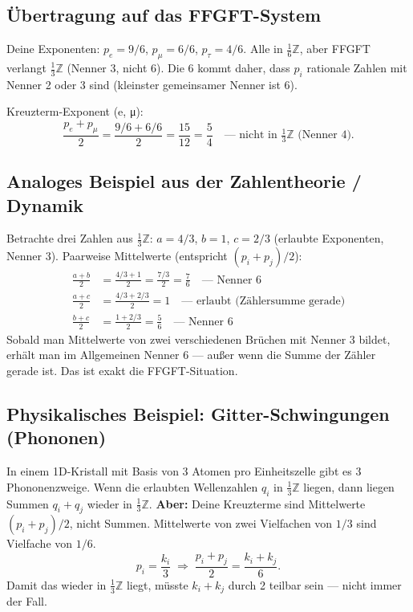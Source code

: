 \subsection{Übertragung auf das FFGFT-System}

Deine Exponenten:
$p_e=9/6$, $p_\mu=6/6$, $p_\tau=4/6$. Alle in $\tfrac{1}{6}\mathbb{Z}$,
aber FFGFT verlangt $\tfrac{1}{3}\mathbb{Z}$ (Nenner 3, nicht 6).
Die 6 kommt daher, dass $p_i$ rationale Zahlen mit Nenner 2 oder 3 sind
(kleinster gemeinsamer Nenner ist 6).

Kreuzterm-Exponent (e, μ):
\[
  \frac{p_e+p_\mu}{2} = \frac{9/6+6/6}{2}
  = \frac{15}{12} = \frac{5}{4}
  \quad\text{— nicht in }\tfrac{1}{3}\mathbb{Z}\text{ (Nenner 4).}
\]

\subsection{Analoges Beispiel aus der Zahlentheorie / Dynamik}

Betrachte drei Zahlen aus $\tfrac{1}{3}\mathbb{Z}$:
$a=4/3$, $b=1$, $c=2/3$ (erlaubte Exponenten, Nenner 3).
Paarweise Mittelwerte (entspricht $(p_i+p_j)/2$):
\begin{align*}
  \frac{a+b}{2} &= \frac{4/3+1}{2} = \frac{7/3}{2} = \frac{7}{6}
    \quad\text{— Nenner 6} \\
  \frac{a+c}{2} &= \frac{4/3+2/3}{2} = 1
    \quad\text{— erlaubt (Zählersumme gerade)} \\
  \frac{b+c}{2} &= \frac{1+2/3}{2} = \frac{5}{6}
    \quad\text{— Nenner 6}
\end{align*}
Sobald man Mittelwerte von zwei verschiedenen Brüchen mit Nenner 3 bildet,
erhält man im Allgemeinen Nenner 6 — außer wenn die Summe der Zähler gerade ist.
Das ist exakt die FFGFT-Situation.

\subsection{Physikalisches Beispiel: Gitter-Schwingungen (Phononen)}

In einem 1D-Kristall mit Basis von 3 Atomen pro Einheitszelle gibt es
3 Phononenzweige. Wenn die erlaubten Wellenzahlen $q_i$ in $\tfrac{1}{3}\mathbb{Z}$
liegen, dann liegen Summen $q_i+q_j$ wieder in $\tfrac{1}{3}\mathbb{Z}$.
\textbf{Aber:} Deine Kreuzterme sind Mittelwerte $(p_i+p_j)/2$, nicht Summen.
Mittelwerte von zwei Vielfachen von $1/3$ sind Vielfache von $1/6$.
\[
  p_i=\frac{k_i}{3}\;\Rightarrow\; \frac{p_i+p_j}{2}=\frac{k_i+k_j}{6}.
\]
Damit das wieder in $\tfrac{1}{3}\mathbb{Z}$ liegt, müsste $k_i+k_j$
durch 2 teilbar sein — nicht immer der Fall.

